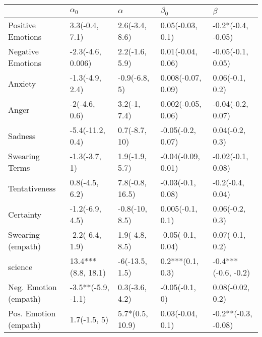 \begin{tabular}{lllll}
\toprule
{} &          $\alpha_0$ &         $\alpha$ &           $\beta_0$ &              $\beta$ \\
\midrule
Positive Emotions     &      3.3(-0.4, 7.1) &   2.6(-3.4, 8.6) &    0.05(-0.03, 0.1) &   -0.2*(-0.4, -0.05) \\
Negative Emotions     &   -2.3(-4.6, 0.006) &   2.2(-1.6, 5.9) &   0.01(-0.04, 0.06) &    -0.05(-0.1, 0.05) \\
Anxiety               &     -1.3(-4.9, 2.4) &    -0.9(-6.8, 5) &  0.008(-0.07, 0.09) &      0.06(-0.1, 0.2) \\
Anger                 &       -2(-4.6, 0.6) &     3.2(-1, 7.4) &  0.002(-0.05, 0.06) &    -0.04(-0.2, 0.07) \\
Sadness               &    -5.4(-11.2, 0.4) &    0.7(-8.7, 10) &   -0.05(-0.2, 0.07) &      0.04(-0.2, 0.3) \\
Swearing Terms        &       -1.3(-3.7, 1) &   1.9(-1.9, 5.7) &  -0.04(-0.09, 0.01) &    -0.02(-0.1, 0.08) \\
Tentativeness         &      0.8(-4.5, 6.2) &  7.8(-0.8, 16.5) &   -0.03(-0.1, 0.08) &     -0.2(-0.4, 0.04) \\
Certainty             &     -1.2(-6.9, 4.5) &   -0.8(-10, 8.5) &    0.005(-0.1, 0.1) &      0.06(-0.2, 0.3) \\
Swearing (empath)     &     -2.2(-6.4, 1.9) &   1.9(-4.8, 8.5) &   -0.05(-0.1, 0.04) &      0.07(-0.1, 0.2) \\
science               &  13.4***(8.8, 18.1) &   -6(-13.5, 1.5) &    0.2***(0.1, 0.3) &  -0.4***(-0.6, -0.2) \\
Neg. Emotion (empath) &  -3.5**(-5.9, -1.1) &   0.3(-3.6, 4.2) &      -0.05(-0.1, 0) &     0.08(-0.02, 0.2) \\
Pos. Emotion (empath) &        1.7(-1.5, 5) &  5.7*(0.5, 10.9) &    0.03(-0.04, 0.1) &  -0.2**(-0.3, -0.08) \\
\bottomrule
\end{tabular}
